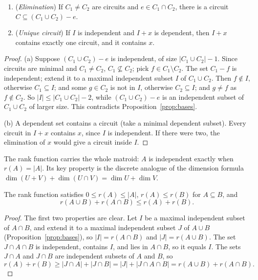 \begin{proposition}[circuits]\label{prop:circuits}
\begin{enumerate}[label=(\alph*)]
\item (\emph{Elimination}) If $C_1\ne C_2$ are circuits and $e\in C_1\cap C_2$, there is a circuit $C\subseteq(C_1\cup C_2)-e$.
\item (\emph{Unique circuit}) If $I$ is independent and $I+x$ is dependent, then $I+x$ contains exactly one circuit, and it contains $x$.
\end{enumerate}
\end{proposition}
\begin{proof}
(a) Suppose $(C_1\cup C_2)-e$ is independent, of size $|C_1\cup C_2|-1$. Since circuits are minimal and $C_1\ne C_2$, $C_1\not\subseteq C_2$; pick $f\in C_1\setminus C_2$. The set $C_1-f$ is independent;
extend it to a maximal independent subset $I$ of $C_1\cup C_2$. Then $f\notin I$, otherwise $C_1\subseteq I$; and some $g\in C_2$ is not in $I$, otherwise $C_2\subseteq I$; and $g\ne f$ as $f\notin C_2$. So
$|I|\le|C_1\cup C_2|-2$, while $(C_1\cup C_2)-e$ is an independent subset of $C_1\cup C_2$ of larger size. This contradicts Proposition~\ref{prop:bases}.

(b) A dependent set contains a circuit (take a minimal dependent subset). Every circuit in $I+x$ contains $x$, since $I$ is independent. If there were two, the elimination of $x$ would give a circuit
inside $I$.
\end{proof}

The rank function carries the whole matroid: $A$ is independent exactly when $r(A)=|A|$. Its key property is the discrete analogue of the dimension formula $\dim(U+V)+\dim(U\cap V)=\dim U+\dim V$.

\begin{theorem}[submodularity]\label{thm:submodular}
The rank function satisfies $0\le r(A)\le|A|$, $r(A)\le r(B)$ for $A\subseteq B$, and
\[
r(A\cup B)+r(A\cap B)\le r(A)+r(B).
\]
\end{theorem}
\begin{proof}
The first two properties are clear. Let $I$ be a maximal independent subset of $A\cap B$, and extend it to a maximal independent subset $J$ of $A\cup B$ (Proposition~\ref{prop:bases}), so $|I|=r(A\cap B)$
and $|J|=r(A\cup B)$. The set $J\cap A\cap B$ is independent, contains $I$, and lies in $A\cap B$, so it equals $I$. The sets $J\cap A$ and $J\cap B$ are independent subsets of $A$ and $B$, so
\[
r(A)+r(B)\ge|J\cap A|+|J\cap B|=|J|+|J\cap A\cap B|=r(A\cup B)+r(A\cap B).
\]
\end{proof}

